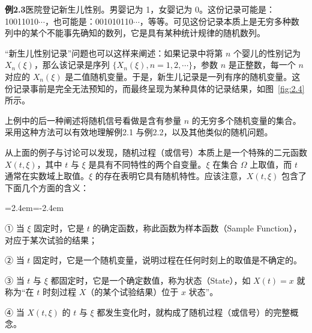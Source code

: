 \documentclass[11pt,openany,UTF8]{ctexbook}
\newenvironment{citemize}
  {\begin{list}{}{\leftmargin=2.4em\itemindent=-2.4em\itemsep=1pt\topsep=3pt\parsep=0pt}}
  {\end{list}}
\begin{document}
\begin{examplebox}
\textbf{例2.3}\quad 医院登记新生儿性别\nobreak。男婴记为 1\nobreak，女婴记为 0\nobreak。这份记录可能是\nobreak：10011010$\cdots$\nobreak，也可能是\nobreak：001010110$\cdots$\nobreak，等等\nobreak。可见这份记录本质上是无穷多种数列中的某个不能事先确知的数列\nobreak，它是具有某种统计规律的随机数列\nobreak。

“新生儿性别记录”问题也可以这样来阐述\nobreak：如果记录中将第 $n$ 个婴儿的性别记为 $X_n(\xi)$\nobreak，那么该记录是序列 $\{X_n(\xi),n=1,2,\cdots\}$\nobreak，参数 $n$ 是正整数\nobreak，每一个 $n$ 对应的 $X_n(\xi)$ 是二值随机变量\nobreak。于是\nobreak，新生儿记录是一列有序的随机变量\nobreak。这份记录事前是完全无法预知的\nobreak，而最终呈现为某种具体的记录结果\nobreak，如图~\ref{fig:2.4} 所示\nobreak。

\begin{center}

  \smallskip
  \label{fig:2.4}
\end{center}
\end{examplebox}

上例中的后一种阐述将随机信号看做是含有参量 $n$ 的无穷多个随机变量的集合\nobreak。采用这种方法可以有效地理解例2.1 与例2.2\nobreak，以及其他类似的随机问题\nobreak。

从上面的例子与讨论可以发现\nobreak，随机过程（或信号\nobreak）本质上是一个特殊的二元函数 $X(t,\xi)$\nobreak，其中 $t$ 与 $\xi$ 是具有不同特性的两个自变量\nobreak。$\xi$ 在集合 $\Omega$ 上取值\nobreak，而 $t$ 通常在实数域上取值\nobreak。$\xi$ 的存在表明它具有随机特性\nobreak。应该注意\nobreak，$X(t,\xi)$ 包含了下面几个方面的含义\nobreak：

\begin{citemize}
\item ① 当 $\xi$ 固定时\nobreak，它是 $t$ 的确定函数\nobreak，称此函数为样本函数（Sample Function\nobreak）\nobreak，对应于某次试验的结果\nobreak；
\item ② 当 $t$ 固定时\nobreak，它是一个随机变量\nobreak，说明过程在任何时刻上的取值是不确定的\nobreak。
\item ③ 当 $t$ 与 $\xi$ 都固定时\nobreak，它是一个确定数值\nobreak，称为状态（State\nobreak）\nobreak，如 $X(t)=x$ 就称为“在 $t$ 时刻过程 $X$（的某个试验结果\nobreak）位于 $x$ 状态”\nobreak。
\item ④ 当 $X(t,\xi)$ 的 $t$ 与 $\xi$ 都发生变化时\nobreak，就构成了随机过程（或信号\nobreak）的完整概念\nobreak。
\end{citemize}
\end{document}
